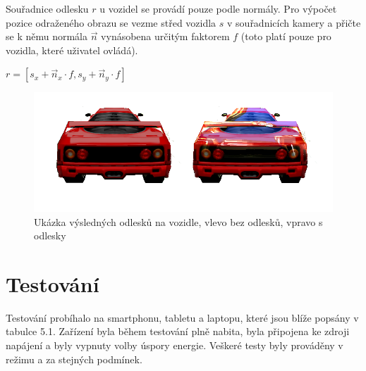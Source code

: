 \documentclass[11pt,twoside,a4paper]{book}
\begin{document}
Souřadnice odlesku $r$ u vozidel se provádí pouze podle normály. Pro výpočet pozice odraženého obrazu se vezme střed vozidla $s$ v souřadnicích kamery a přičte se k němu normála $\vec{n}$ vynásobena určitým faktorem $f$ (toto platí pouze pro vozidla, které uživatel ovládá).
\begin{center}
$r = [s_x + \vec{n}_x \cdot f, s_y + \vec{n}_y \cdot f]$
\end{center}

\begin{center}
\begin{figure}[h!]
\includegraphics[width=130mm]{figures/reflect-car.png}
\caption{Ukázka výsledných odlesků na vozidle, vlevo bez odlesků, vpravo s odlesky}
\end{figure}
\end{center}

\chapter{Testování}
Testování probíhalo na smartphonu, tabletu a laptopu, které jsou blíže popsány v tabulce 5.1. Zařízení byla během testování plně nabita, byla připojena ke zdroji napájení a byly vypnuty volby úspory energie. Veškeré testy byly prováděny v režimu  a za stejných podmínek.
\end{document}
